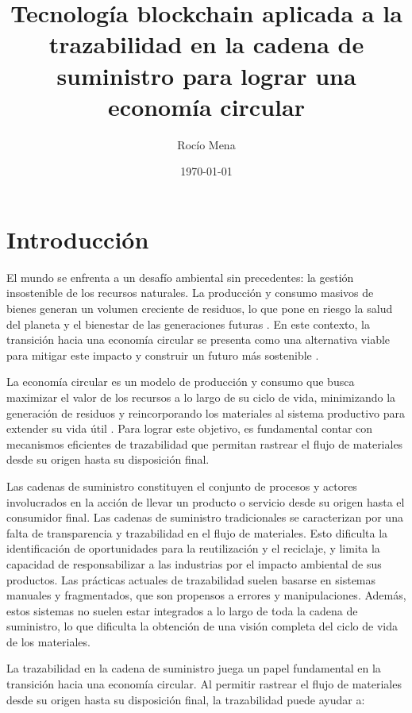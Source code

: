 \documentclass{article}
\title{Tecnología blockchain aplicada a la trazabilidad en la cadena de suministro para lograr una economía circular}
\author{Rocío Mena}
\date{\today}
\begin{document}
\maketitle

\section{Introducción}

El mundo se enfrenta a un desafío ambiental sin precedentes: la gestión insostenible de los recursos naturales. La producción y consumo masivos de bienes generan un volumen creciente de residuos, lo que pone en riesgo la salud del planeta y el bienestar de las generaciones futuras \cite{IPCC2022, pelegri2021ipcc}. En este contexto, la transición hacia una economía circular se presenta como una alternativa viable para mitigar este impacto y construir un futuro más sostenible \cite{clima2022book}.

La economía circular es un modelo de producción y consumo que busca maximizar el valor de los recursos a lo largo de su ciclo de vida, minimizando la generación de residuos y reincorporando los materiales al sistema productivo para extender su vida útil \cite{da2022economia, melendez2021economia}. Para lograr este objetivo, es fundamental contar con mecanismos eficientes de trazabilidad que permitan rastrear el flujo de materiales desde su origen hasta su disposición final.

Las cadenas de suministro constituyen el conjunto de procesos y actores involucrados en la acción de llevar un producto o servicio desde su origen hasta el consumidor final. Las cadenas de suministro tradicionales se caracterizan por una falta de transparencia y trazabilidad en el flujo de materiales. Esto dificulta la identificación de oportunidades para la reutilización y el reciclaje, y limita la capacidad de responsabilizar a las industrias por el impacto ambiental de sus productos. Las prácticas actuales de trazabilidad suelen basarse en sistemas manuales y fragmentados, que son propensos a errores y manipulaciones. Además, estos sistemas no suelen estar integrados a lo largo de toda la cadena de suministro, lo que dificulta la obtención de una visión completa del ciclo de vida de los materiales.

La trazabilidad en la cadena de suministro juega un papel fundamental en la transición hacia una economía circular. Al permitir rastrear el flujo de materiales desde su origen hasta su disposición final, la trazabilidad puede ayudar a:
\end{document}
